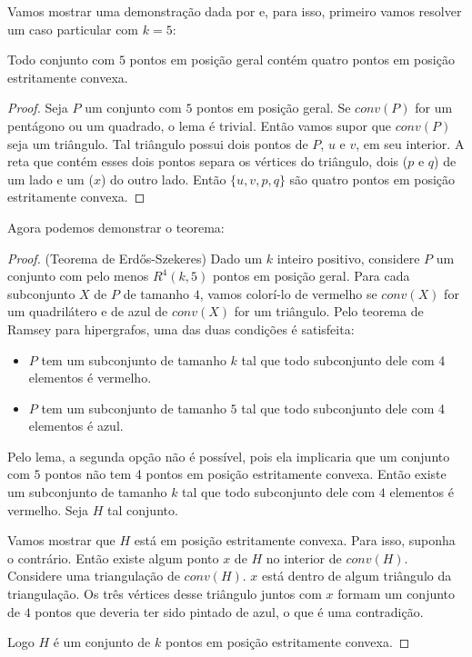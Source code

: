Vamos mostrar uma demonstração dada por \cite{ES} e, para isso, primeiro vamos resolver um caso particular com $k=5$:
\begin{lema}
    Todo conjunto com $5$ pontos em posição geral contém quatro pontos em posição estritamente convexa.
\end{lema}
\begin{proof}
    Seja $P$ um conjunto com $5$ pontos em posição geral. Se $conv(P)$ for um pentágono ou um quadrado, o lema é trivial.
    Então vamos supor que $conv(P)$ seja um triângulo. Tal triângulo possui dois pontos de $P$, $u$ e $v$, em seu interior. A reta que contém esses dois pontos separa os vértices do triângulo, dois ($p$ e $q$) de um lado e um ($x$) do outro lado. Então $\{u,v,p,q\}$ são quatro pontos em posição estritamente convexa.
\end{proof}

Agora podemos demonstrar o teorema:
\begin{proof}(Teorema de Erd\H os-Szekeres)
    Dado um $k$ inteiro positivo, considere $P$ um conjunto com pelo menos $R^4(k,5)$ pontos em posição geral. Para cada subconjunto $X$ de $P$ de tamanho $4$, vamos colorí-lo de vermelho se $conv(X)$ for um quadrilátero e de azul de $conv(X)$ for um triângulo. Pelo teorema de Ramsey para hipergrafos, uma das duas condições é satisfeita:
    \begin{itemize}
        \item $P$ tem um subconjunto de tamanho $k$ tal que todo subconjunto dele com 4 elementos é vermelho.
        \item $P$ tem um subconjunto de tamanho $5$ tal que todo subconjunto dele com 4 elementos é azul.
    \end{itemize}
    Pelo lema, a segunda opção não é possível, pois ela implicaria que um conjunto com $5$ pontos não tem 4 pontos em posição estritamente convexa. Então existe um subconjunto de tamanho $k$ tal que todo subconjunto dele com $4$ elementos é vermelho. Seja $H$ tal conjunto.

    Vamos mostrar que $H$ está em posição estritamente convexa. Para isso, suponha o contrário. Então existe algum ponto $x$ de $H$ no interior de $conv(H)$. Considere uma triangulação de $conv(H)$. $x$ está dentro de algum triângulo da triangulação. Os três vértices desse triângulo juntos com $x$ formam um conjunto de $4$ pontos que deveria ter sido pintado de azul, o que é uma contradição.

    Logo $H$ é um conjunto de $k$ pontos em posição estritamente convexa.
\end{proof}


